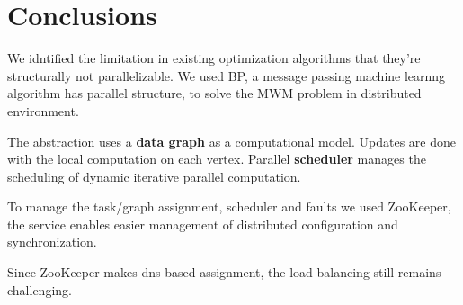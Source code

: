 
\section{Conclusions}

We idntified the limitation in existing optimization algorithms that they're structurally not parallelizable. We used BP, a message passing machine learnng algorithm has parallel structure, to solve the MWM problem in distributed environment. 

The abstraction uses a \textbf{data graph} as a computational model. Updates are done with the local computation on each vertex. Parallel \textbf{scheduler} manages the scheduling of dynamic iterative parallel computation.  

To manage the task/graph assignment, scheduler and faults we used ZooKeeper, the service enables easier management of distributed configuration and synchronization. 

Since ZooKeeper makes dns-based assignment, the load balancing still remains challenging. 


